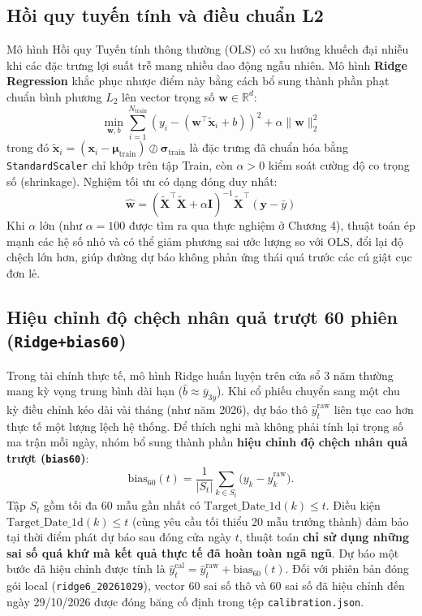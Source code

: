 \documentclass[12pt,a4paper]{report}
\begin{document}
\subsection{Hồi quy tuyến tính và điều chuẩn L2}
Mô hình Hồi quy Tuyến tính thông thường (OLS) có xu hướng khuếch đại nhiễu khi các đặc trưng lợi suất trễ mang nhiều dao động ngẫu nhiên. Mô hình \textbf{Ridge Regression} \cite{hoerl1970ridge,pedregosa2011sklearn} khắc phục nhược điểm này bằng cách bổ sung thành phần phạt chuẩn bình phương $L_2$ lên vector trọng số $\mathbf{w} \in \mathbb{R}^d$:
\begin{equation}
    \min_{\mathbf{w}, b} \sum_{i=1}^{N_{\text{train}}} \left(y_i - (\mathbf{w}^\top \tilde{\mathbf{x}}_i + b)\right)^2 + \alpha \|\mathbf{w}\|_2^2
    \label{eq:ch3_ridge}
\end{equation}
trong đó $\tilde{\mathbf{x}}_i = (\mathbf{x}_i - \boldsymbol{\mu}_{\text{train}}) \oslash \boldsymbol{\sigma}_{\text{train}}$ là đặc trưng đã chuẩn hóa bằng \texttt{StandardScaler} chỉ khớp trên tập Train, còn $\alpha > 0$ kiểm soát cường độ co trọng số (shrinkage). Nghiệm tối ưu có dạng đóng duy nhất:
\begin{equation}
    \hat{\mathbf{w}} = \left(\tilde{\mathbf{X}}^\top \tilde{\mathbf{X}} + \alpha \mathbf{I}\right)^{-1} \tilde{\mathbf{X}}^\top (\mathbf{y} - \bar{y})
\end{equation}
Khi $\alpha$ lớn (như $\alpha = 100$ được tìm ra qua thực nghiệm ở Chương 4), thuật toán ép mạnh các hệ số nhỏ và có thể giảm phương sai ước lượng so với OLS, đổi lại độ chệch lớn hơn, giúp đường dự báo không phản ứng thái quá trước các cú giật cục đơn lẻ.

\subsection{Hiệu chỉnh độ chệch nhân quả trượt 60 phiên (\texttt{Ridge+bias60})}
Trong tài chính thực tế, mô hình Ridge huấn luyện trên cửa sổ 3 năm thường mang kỳ vọng trung bình dài hạn ($\hat{b} \approx \bar{y}_{3y}$). Khi cổ phiếu chuyển sang một chu kỳ điều chỉnh kéo dài vài tháng (như năm 2026), dự báo thô $\hat{y}_t^{\text{raw}}$ liên tục cao hơn thực tế một lượng lệch hệ thống. Để thích nghi mà không phải tính lại trọng số ma trận mỗi ngày, nhóm bổ sung thành phần \textbf{hiệu chỉnh độ chệch nhân quả trượt (\texttt{bias60})}:
\begin{equation}
    \text{bias}_{60}(t)
       = \frac{1}{|S_t|}\sum_{k\in S_t}\bigl(y_k-\hat{y}^{\text{raw}}_k\bigr).
\end{equation}
Tập $S_t$ gồm tối đa 60 mẫu gần nhất có $\text{Target\_Date\_1d}(k)\le t$.
Điều kiện $\text{Target\_Date\_1d}(k) \le t$ (cùng yêu cầu tối thiểu 20 mẫu trưởng thành) đảm bảo tại thời điểm phát dự báo sau đóng cửa ngày $t$, thuật toán \textbf{chỉ sử dụng những sai số quá khứ mà kết quả thực tế đã hoàn toàn ngã ngũ}. Dự báo một bước đã hiệu chỉnh được tính là $\hat{y}_t^{\text{cal}} = \hat{y}_t^{\text{raw}} + \text{bias}_{60}(t)$. Đối với phiên bản đóng gói local (\nolinkurl{ridge6_20261029}), vector 60 sai số thô và 60 sai số đã hiệu chỉnh đến ngày 29/10/2026 được đóng băng cố định trong tệp \nolinkurl{calibration.json}.
\end{document}
